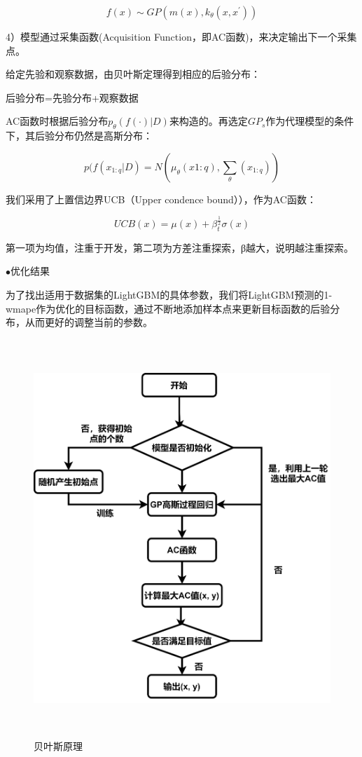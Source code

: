 \documentclass[withoutpreface,bwprint]{cumcmthesis}
\begin{document}
    $$f(x) \sim GP(m(x),k_{\theta}(x,x^{'}))$$
    
    4）模型通过采集函数(Acquisition Function，即AC函数)，来决定输出下一个采集点。

    给定先验和观察数据，由贝叶斯定理得到相应的后验分布：
    
    后验分布=先验分布+观察数据

    AC函数时根据后验分布$p_\theta (f(\cdot)|D)$来构造的。再选定$GP_s$作为代理模型的条件下，其后验分布仍然是高斯分布：

    $$p(f(x_{1:q}|D)=N(\mu_{\theta}(x{1:q}),\sum_{\theta}(x_{1:q}))$$

    我们采用了上置信边界UCB（Upper condence bound）），作为AC函数：

$$UCB(x)=\mu(x)+\beta_t^{\frac{1}{2}} \sigma(x)$$

    第一项为均值，注重于开发，第二项为方差注重探索，β越大，说明越注重探索。

$\bullet$优化结果
    
   为了找出适用于数据集的LightGBM的具体参数，我们将LightGBM预测的1-wmape作为优化的目标函数，通过不断地添加样本点来更新目标函数的后验分布，从而更好的调整当前的参数。
  
    \begin{figure}[htbp]
     \centering
     \includegraphics[width=14cm,height=15cm]{figure/贝叶斯.png}%
     \caption{贝叶斯原理}
     \label{贝叶斯原理}
    \end{figure}
\end{document}
